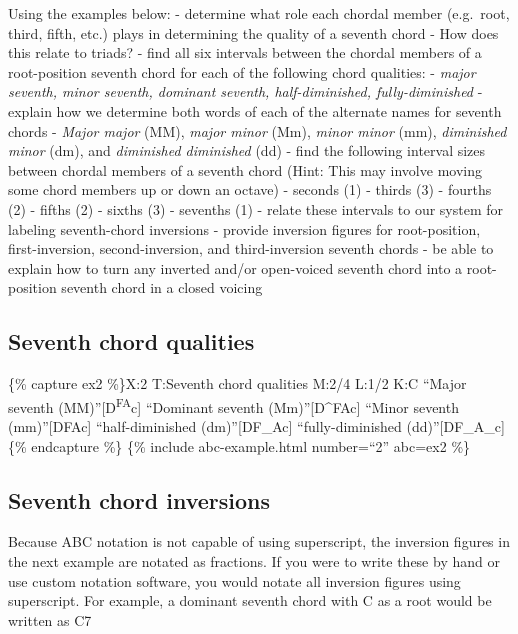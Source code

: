 \documentclass{book}
\begin{document}
Using the examples below: - determine what role each chordal member
(e.g.~root, third, fifth, etc.) plays in determining the quality of a seventh
chord - How does this relate to triads? - find all six intervals between the
chordal members of a root-position seventh chord for each of the following
chord qualities: - \emph{major seventh, minor seventh, dominant seventh,
half-diminished, fully-diminished} - explain how we determine both words of
each of the alternate names for seventh chords - \emph{Major major} (MM),
\emph{major minor} (Mm), \emph{minor minor} (mm), \emph{diminished minor}
(dm), and \emph{diminished diminished} (dd) - find the following interval
sizes between chordal members of a seventh chord (Hint: This may involve
moving some chord members up or down an octave) - seconds (1) - thirds (3) -
fourths (2) - fifths (2) - sixths (3) - sevenths (1) - relate these intervals
to our system for labeling seventh-chord inversions - provide inversion
figures for root-position, first-inversion, second-inversion, and
third-inversion seventh chords - be able to explain how to turn any inverted
and/or open-voiced seventh chord into a root-position seventh chord in a
closed voicing

\hypertarget{seventh-chord-qualities}{%
\subsection{Seventh chord qualities}\label{seventh-chord-qualities}}

\{\% capture ex2 \%\}X:2 T:Seventh chord qualities M:2/4 L:1/2 K:C ``Major
seventh (MM)''{[}D\textsuperscript{FA}c{]}\textbar{} ``Dominant seventh
(Mm)''{[}D\^{}FAc{]}\textbar{} ``Minor seventh (mm)''{[}DFAc{]}\textbar{}
``half-diminished (dm)''{[}DF\_Ac{]}\textbar{} ``fully-diminished
(dd)''{[}DF\_A\_c{]}\textbar\textbar\{\% endcapture \%\} \{\% include
abc-example.html number=``2'' abc=ex2 \%\}

\hypertarget{seventh-chord-inversions-1}{%
\subsection{Seventh chord inversions}\label{seventh-chord-inversions-1}}

Because ABC notation is not capable of using superscript, the inversion
figures in the next example are notated as fractions. If you were to write
these by hand or use custom notation software, you would notate all inversion
figures using superscript. For example, a dominant seventh chord with C as a
root would be written as C7
\end{document}
